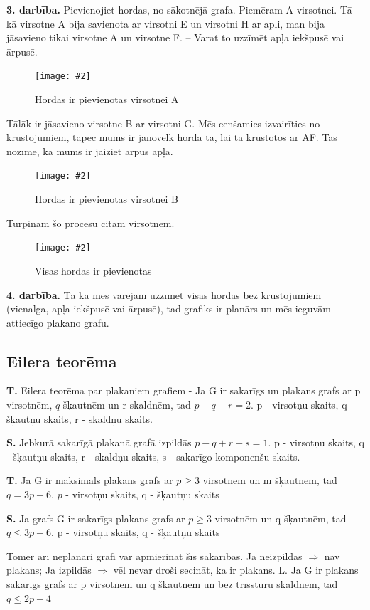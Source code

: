 \documentclass{article}
\newcommand{\illustration}[3]{
	\begin{figure}[H]
		\centering	
		\texttt{[image: \#2]}
		\caption{#3}
	\end{figure}
}
\begin{document}
\textbf{3. darbība.} Pievienojiet hordas, no sākotnējā grafa.  Piemēram A virsotnei. Tā kā virsotne A bija savienota ar virsotni E un virsotni H ar apli, man bija jāsavieno tikai virsotne A un virsotne F. – Varat to uzzīmēt apļa iekšpusē vai ārpusē.


\illustration{0.5}{circle_chord_method-4}{Hordas ir pievienotas virsotnei A}

Tālāk ir jāsavieno virsotne B ar virsotni G. Mēs cenšamies izvairīties no krustojumiem, tāpēc mums ir jānovelk horda tā, lai tā krustotos ar AF.  Tas nozīmē, ka mums ir jāiziet ārpus apļa.

\illustration{0.5}{circle_chord_method-6}{Hordas ir pievienotas virsotnei B}

Turpinam šo procesu citām virsotnēm.

\illustration{0.5}{circle_chord_method-7}{Visas hordas ir pievienotas}

\textbf{4. darbība.} Tā kā mēs varējām uzzīmēt visas hordas bez krustojumiem (vienalga, apļa iekšpusē vai ārpusē), tad grafiks ir planārs un mēs ieguvām attiecīgo plakano grafu.

\subsection{Eilera teorēma}

\textbf{T.} Eilera teorēma par plakaniem grafiem - Ja G ir sakarīgs un plakans grafs ar p virsotnēm, $q$ šķautnēm un r skaldnēm, tad $p − q + r = 2$.  p - virsotņu skaits, q - šķautņu skaits, r - skaldņu skaits.

\textbf{S. } Jebkurā sakarīgā plakanā grafā izpildās $p − q + r − s = 1$.  p - virsotņu skaits, q - šķautņu skaits, r - skaldņu skaits, s - sakarīgo komponenšu skaits.

\textbf{T.}  Ja G ir maksimāls plakans grafs ar $p \ge 3$ virsotnēm un m šķautnēm, tad $q = 3p − 6$.  $p$ - virsotņu skaits, q - šķautņu skaits

\textbf{S. } Ja grafs G ir sakarīgs plakans grafs ar $p \ge 3$ virsotnēm un q šķautnēm, tad $q \le 3p − 6$.  p - virsotņu skaits, q - šķautņu skaits

Tomēr arī neplanāri grafi var apmierināt šīs sakarības.  Ja neizpildās $\Rightarrow$ nav plakans; Ja izpildās $\Rightarrow$ vēl nevar droši secināt, ka ir plakans. L.  Ja G ir plakans sakarīgs grafs ar p virsotnēm un q šķautnēm un bez trīsstūru skaldnēm, tad $q \le 2p − 4$
\end{document}
